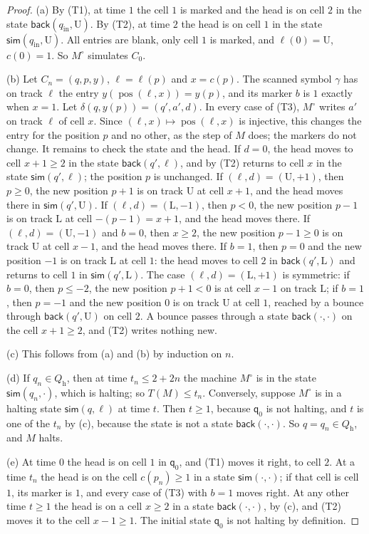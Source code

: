 \begin{proof}
(a) By (T1), at time $1$ the cell $1$ is marked and the head is on cell $2$ in the state $\mathsf{back}(q_{\mathrm{in}},\mathrm U)$. By (T2), at time $2$ the head is on cell $1$ in the state $\mathsf{sim}(q_{\mathrm{in}},\mathrm U)$. All entries are blank, only cell $1$ is marked, and $\ell(0)=\mathrm U$, $c(0)=1$. So $M^\circ$ simulates $C_0$.

(b) Let $C_n=(q,p,y)$, $\ell=\ell(p)$ and $x=c(p)$. The scanned symbol $\gamma$ has on track $\ell$ the entry $y(\operatorname{pos}(\ell,x))=y(p)$, and its marker $b$ is $1$ exactly when $x=1$. Let $\delta(q,y(p))=(q',a',d)$. In every case of (T3), $M^\circ$ writes $a'$ on track $\ell$ of cell $x$. Since $(\ell,x)\mapsto\operatorname{pos}(\ell,x)$ is injective, this changes the entry for the position $p$ and no other, as the step of $M$ does; the markers do not change. It remains to check the state and the head. If $d=0$, the head moves to cell $x+1\ge2$ in the state $\mathsf{back}(q',\ell)$, and by (T2) returns to cell $x$ in the state $\mathsf{sim}(q',\ell)$; the position $p$ is unchanged. If $(\ell,d)=(\mathrm U,+1)$, then $p\ge0$, the new position $p+1$ is on track $\mathrm U$ at cell $x+1$, and the head moves there in $\mathsf{sim}(q',\mathrm U)$. If $(\ell,d)=(\mathrm L,-1)$, then $p<0$, the new position $p-1$ is on track $\mathrm L$ at cell $-(p-1)=x+1$, and the head moves there. If $(\ell,d)=(\mathrm U,-1)$ and $b=0$, then $x\ge2$, the new position $p-1\ge0$ is on track $\mathrm U$ at cell $x-1$, and the head moves there. If $b=1$, then $p=0$ and the new position $-1$ is on track $\mathrm L$ at cell $1$: the head moves to cell $2$ in $\mathsf{back}(q',\mathrm L)$ and returns to cell $1$ in $\mathsf{sim}(q',\mathrm L)$. The case $(\ell,d)=(\mathrm L,+1)$ is symmetric: if $b=0$, then $p\le-2$, the new position $p+1<0$ is at cell $x-1$ on track $\mathrm L$; if $b=1$, then $p=-1$ and the new position $0$ is on track $\mathrm U$ at cell $1$, reached by a bounce through $\mathsf{back}(q',\mathrm U)$ on cell $2$. A bounce passes through a state $\mathsf{back}(\cdot,\cdot)$ on the cell $x+1\ge2$, and (T2) writes nothing new.

(c) This follows from (a) and (b) by induction on $n$.

(d) If $q_n\in Q_{\mathrm h}$, then at time $t_n\le2+2n$ the machine $M^\circ$ is in the state $\mathsf{sim}(q_n,\cdot)$, which is halting; so $T(M)\le t_n$. Conversely, suppose $M^\circ$ is in a halting state $\mathsf{sim}(q,\ell)$ at time $t$. Then $t\ge1$, because $\mathsf q_0$ is not halting, and $t$ is one of the $t_n$ by (c), because the state is not a state $\mathsf{back}(\cdot,\cdot)$. So $q=q_n\in Q_{\mathrm h}$, and $M$ halts.

(e) At time $0$ the head is on cell $1$ in $\mathsf q_0$, and (T1) moves it right, to cell $2$. At a time $t_n$ the head is on the cell $c(p_n)\ge1$ in a state $\mathsf{sim}(\cdot,\cdot)$; if that cell is cell $1$, its marker is $1$, and every case of (T3) with $b=1$ moves right. At any other time $t\ge1$ the head is on a cell $x\ge2$ in a state $\mathsf{back}(\cdot,\cdot)$, by (c), and (T2) moves it to the cell $x-1\ge1$. The initial state $\mathsf q_0$ is not halting by definition.
\end{proof}

